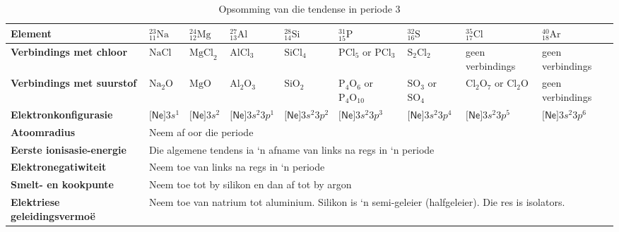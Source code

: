 \begin{table}[H]
 \begin{center}
  \begin{tabular}{|p{1.5cm}|p{1cm}|p{1cm}|p{1.5cm}|p{1.5cm}|p{1.5cm}|p{1.5cm}|p{1.5cm}|p{1.5cm}|} \hline
\textbf{Element} & $^{23}_{11}\text{Na}$ & $^{24}_{12}\text{Mg}$ &  $^{27}_{13}\text{Al}$ & $^{28}_{14}\text{Si}$ &  $^{31}_{15}\text{P}$ & $^{32}_{16}\text{S}$ & $^{35}_{17}\text{Cl}$ & $^{40}_{18}\text{Ar}$\\ \hline
   \textbf{Verbindings met chloor} & $\text{NaCl}$ & $\text{MgCl}_2$ & $\text{AlCl}_{3}$ & $\text{SiCl}_{4}$ & $\text{PCl}_{5}$ or $\text{PCl}_{3}$ & $\text{S}_{2}\text{Cl}_{2}$ & geen verbindings & geen verbindings \\ \hline
\textbf{Verbindings met suurstof} & $\text{Na}_{2}\text{O}$ & $\text{MgO}$ & $\text{Al}_{2}\text{O}_{3}$ & $\text{SiO}_{2}$ & $\text{P}_{4}\text{O}_{6}$ or $\text{P}_{4}\text{O}_{10}$ & $\text{SO}_{3}$ or $\text{SO}_{4}$ & $\text{Cl}_{2}\text{O}_{7}$ or $\text{Cl}_{2}\text{O}$ & geen verbindings \\ \hline
\textbf{Elektronkonfigurasie} & $\textsf{[Ne]}3s^{1}$ & $\textsf{[Ne]}3s^{2}$ & $\textsf{[Ne]}3s^{2}3p^{1}$ & $\textsf{[Ne]}3s^{2}3p^{2}$ & $\textsf{[Ne]}3s^{2}3p^{3}$ & $\textsf{[Ne]}3s^{2}3p^{4}$ & $\textsf{[Ne]}3s^{2}3p^{5}$ & $\textsf{[Ne]}3s^{2}3p^{6}$ \\ \hline
\textbf{Atoomradius} & \multicolumn{8}{p{8cm}|}{Neem af oor die periode} \\ \hline
\textbf{Eerste ionisasie-energie} & \multicolumn{8}{p{8cm}|}{Die algemene tendens ia ‘n afname van links na regs in ‘n periode} \\ \hline
\textbf{Elektronegatiwiteit} & \multicolumn{8}{p{8cm}|}{Neem toe van links na regs in ‘n periode} \\ \hline
\textbf{Smelt- en kookpunte} & \multicolumn{8}{p{8cm}|}{Neem toe tot by silikon en dan af tot by argon} \\ \hline
\textbf{Elektriese geleidingsvermo\"{e}} & \multicolumn{8}{p{10cm}|}{Neem toe van natrium tot aluminium. Silikon is ‘n semi-geleier (halfgeleier). Die res is isolators. } \\ \hline
  \end{tabular}
\caption{Opsomming van die tendense in periode 3}
\label{tab:period3trends}
 \end{center}

\end{table}

